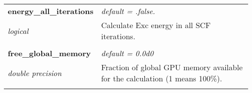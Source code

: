 \begin{Spacing}{1.0}
\begin{longtable}{ p{} p{} }
   \textbf{energy\_all\_iterations}
   &  \textit{default = .false. }
   \\*\textit{logical}
   & Calculate Exc energy in all SCF iterations.\\* \\

   \textbf{free\_global\_memory}
   &  \textit{default = 0.0d0}
   \\*\textit{double precision}
   & Fraction of global GPU memory available for the
   calculation (1 means 100\%).\\* \\


\end{longtable}
\end{Spacing}
